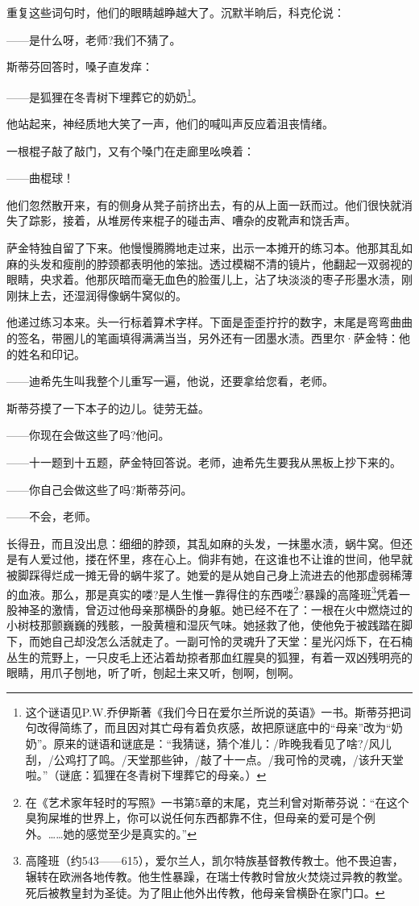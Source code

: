 \par 重复这些词句时，他们的眼睛越睁越大了。沉默半晌后，科克伦说：
\par ——是什么呀，老师?我们不猜了。
\par 斯蒂芬回答时，嗓子直发痒：
\par ——是狐狸在冬青树下埋葬它的奶奶\footnote{这个谜语见P.W.乔伊斯著《我们今日在爱尔兰所说的英语》一书。斯蒂芬把词句改得简练了，而且因对其亡母有着负疚感，故把原谜底中的“母亲”改为“奶奶”。原来的谜语和谜底是：“我猜谜，猜个准儿：/昨晚我看见了啥?/风儿刮，/公鸡打了鸣。/天堂那些钟，/敲了十一点。/我可怜的灵魂，/该升天堂啦。”（谜底：狐狸在冬青树下埋葬它的母亲。）}。
\par 他站起来，神经质地大笑了一声，他们的喊叫声反应着沮丧情绪。
\par 一根棍子敲了敲门，又有个嗓门在走廊里吆唤着：
\par ——曲棍球！
\par 他们忽然散开来，有的侧身从凳子前挤出去，有的从上面一跃而过。他们很快就消失了踪影，接着，从堆房传来棍子的碰击声、嘈杂的皮靴声和饶舌声。
\par 萨金特独自留了下来。他慢慢腾腾地走过来，出示一本摊开的练习本。他那其乱如麻的头发和瘦削的脖颈都表明他的笨拙。透过模糊不清的镜片，他翻起一双弱视的眼睛，央求着。他那灰暗而毫无血色的脸蛋儿上，沾了块淡淡的枣子形墨水渍，刚刚抹上去，还湿润得像蜗牛窝似的。
\par 他递过练习本来。头一行标着算术字样。下面是歪歪拧拧的数字，末尾是弯弯曲曲的签名，带圈儿的笔画填得满满当当，另外还有一团墨水渍。西里尔·萨金特：他的姓名和印记。
\par ——迪希先生叫我整个儿重写一遍，他说，还要拿给您看，老师。
\par 斯蒂芬摸了一下本子的边儿。徒劳无益。
\par ——你现在会做这些了吗?他问。
\par ——十一题到十五题，萨金特回答说。老师，迪希先生要我从黑板上抄下来的。
\par ——你自己会做这些了吗?斯蒂芬问。
\par ——不会，老师。
\par 长得丑，而且没出息：细细的脖颈，其乱如麻的头发，一抹墨水渍，蜗牛窝。但还是有人爱过他，搂在怀里，疼在心上。倘非有她，在这谁也不让谁的世间，他早就被脚踩得烂成一摊无骨的蜗牛浆了。她爱的是从她自己身上流进去的他那虚弱稀薄的血液。那么，那是真实的喽?是人生惟一靠得住的东西喽\footnote{在《艺术家年轻时的写照》一书第5章的末尾，克兰利曾对斯蒂芬说：“在这个臭狗屎堆的世界上，你可以说任何东西都靠不住，但母亲的爱可是个例外。……她的感觉至少是真实的。”}?暴躁的高隆班\footnote{高隆班（约543——615），爱尔兰人，凯尔特族基督教传教士。他不畏迫害，辗转在欧洲各地传教。他生性暴躁，在瑞士传教时曾放火焚烧过异教的教堂。死后被教皇封为圣徒。为了阻止他外出传教，他母亲曾横卧在家门口。}凭着一股神圣的激情，曾迈过他母亲那横卧的身躯。她已经不在了：一根在火中燃烧过的小树枝那颤巍巍的残骸，一股黄檀和湿灰气味。她拯救了他，使他免于被践踏在脚下，而她自己却没怎么活就走了。一副可怜的灵魂升了天堂：星光闪烁下，在石楠丛生的荒野上，一只皮毛上还沾着劫掠者那血红腥臭的狐狸，有着一双凶残明亮的眼睛，用爪子刨地，听了听，刨起土来又听，刨啊，刨啊。
